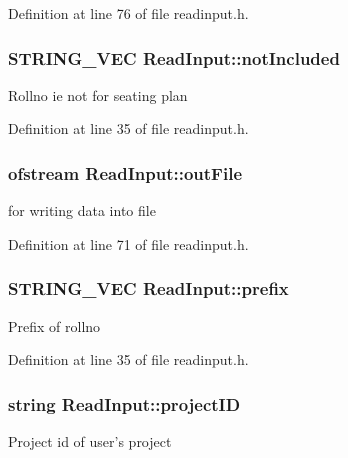 Definition at line 76 of file readinput.\-h.

\hypertarget{classReadInput_a4b4854ad4dd83b96d6c38d1f0b8d5417}{
\subsubsection[{not\-Included}]{\setlength{\rightskip}{0pt plus 5cm}S\-T\-R\-I\-N\-G\-\_\-\-V\-E\-C Read\-Input\-::not\-Included\hspace{0.3cm}{\ttfamily [protected]}}}\label{classReadInput_a4b4854ad4dd83b96d6c38d1f0b8d5417}
Rollno ie not for seating plan 

Definition at line 35 of file readinput.\-h.

\hypertarget{classReadInput_af50237ba8a8e8e4a9e4ccc7926215937}{
\subsubsection[{out\-File}]{\setlength{\rightskip}{0pt plus 5cm}ofstream Read\-Input\-::out\-File\hspace{0.3cm}{\ttfamily [protected]}}}\label{classReadInput_af50237ba8a8e8e4a9e4ccc7926215937}
for writing data into file 

Definition at line 71 of file readinput.\-h.

\hypertarget{classReadInput_a6a96c934f8c9a2a2056dc50505017e52}{
\subsubsection[{prefix}]{\setlength{\rightskip}{0pt plus 5cm}S\-T\-R\-I\-N\-G\-\_\-\-V\-E\-C Read\-Input\-::prefix\hspace{0.3cm}{\ttfamily [protected]}}}\label{classReadInput_a6a96c934f8c9a2a2056dc50505017e52}
Prefix of rollno 

Definition at line 35 of file readinput.\-h.

\hypertarget{classReadInput_a3ad470a25b3e0a29466bf4ff1f7d8e81}{
\subsubsection[{project\-I\-D}]{\setlength{\rightskip}{0pt plus 5cm}string Read\-Input\-::project\-I\-D\hspace{0.3cm}{\ttfamily [protected]}}}\label{classReadInput_a3ad470a25b3e0a29466bf4ff1f7d8e81}
Project id of user's project 

